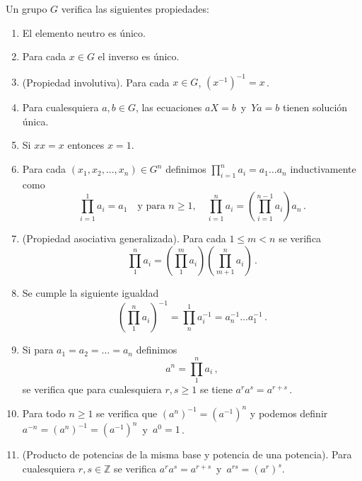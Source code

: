\begin{nprop}
Un grupo $G$ verifica las siguientes propiedades:
\begin{enumerate}
  \item El elemento neutro es único.
  \item Para cada $x \in G$ el inverso es único.
  \item (Propiedad involutiva). Para cada $x \in G$, $(x^{-1})^{-1} = x$\,.
  \item Para cualesquiera $a,b \in G$, las ecuaciones $aX = b$\, y \,$Ya = b$ tienen solución única.
  \item Si $xx = x$ entonces $x=1$.
  \item Para cada $(x_1,x_2,...,x_n) \in G^{n}$ definimos $\prod_{i=1}^{n} a_i = a_1\hdots a_n$ inductivamente como \begin{equation*}
    \prod_{i=1}^{1} a_i = a_1 \quad \text{y para } n \geq 1, \quad \prod_{i=1}^{n} a_i = \left(\prod_{i=1}^{n-1} a_i\right)a_n\,.
  \end{equation*}
  \item (Propiedad asociativa generalizada). Para cada $1 \leq m < n$ se verifica \begin{equation*}
    \prod_{1}^{n} a_i = \left(\prod_{1}^{m} a_i\right)\left(\prod_{m+1}^{n} a_i\right)\,.
  \end{equation*}
  \item Se cumple la siguiente igualdad \begin{equation*}
    \left(\prod_{1}^n a_i\right)^{-1} = \prod_{n}^{1} a_i^{-1} = a_n^{-1}...a_1^{-1}\,.
  \end{equation*}
  \item Si para $a_1 = a_2 = \hdots = a_n$ definimos \begin{equation*}
    a^n = \prod_{1}^{n} a_i\,,
  \end{equation*} se verifica que para cualesquiera $r,s \ge 1$ se tiene $a^ra^s= a^{r+s}$\,.
  \item Para todo $n \ge 1$ se verifica que $\left(a^n\right)^{-1} = \left(a^{-1}\right)^n$ y podemos definir $a^{-n} = \left(a^n\right)^{-1} = \left(a^{-1}\right)^n$\, y \,$a^0 = 1$\,.
  \item (Producto de potencias de la misma base y potencia de una potencia). Para cualesquiera $r,s \in \mathbb{Z}$ se verifica $a^ra^s = a^{r+s}$\, y\, $a^{rs} = \left(a^r\right)^s$.
\end{enumerate}

\end{nprop}
